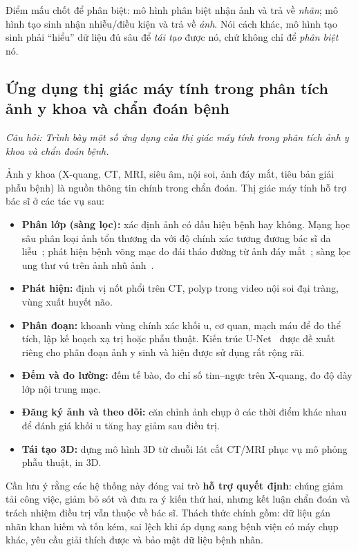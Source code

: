Điểm mấu chốt để phân biệt: mô hình phân biệt nhận ảnh và trả về \emph{nhãn}; mô hình tạo sinh nhận nhiễu/điều kiện và trả về \emph{ảnh}. Nói cách khác, mô hình tạo sinh phải ``hiểu'' dữ liệu đủ sâu để \emph{tái tạo} được nó, chứ không chỉ để \emph{phân biệt} nó.

\subsection{Ứng dụng thị giác máy tính trong phân tích ảnh y khoa và chẩn đoán bệnh}
\label{subsec:w2_medical}

\textit{Câu hỏi: Trình bày một số ứng dụng của thị giác máy tính trong phân tích ảnh y khoa và chẩn đoán bệnh.}

Ảnh y khoa (X-quang, CT, MRI, siêu âm, nội soi, ảnh đáy mắt, tiêu bản giải phẫu bệnh) là nguồn thông tin chính trong chẩn đoán. Thị giác máy tính hỗ trợ bác sĩ ở các tác vụ sau:

\begin{itemize}
    \item \textbf{Phân lớp (sàng lọc):} xác định ảnh có dấu hiệu bệnh hay không. Mạng học sâu phân loại ảnh tổn thương da với độ chính xác tương đương bác sĩ da liễu~\citep{esteva2017dermatologist}; phát hiện bệnh võng mạc do đái tháo đường từ ảnh đáy mắt~\citep{gulshan2016development}; sàng lọc ung thư vú trên ảnh nhũ ảnh~\citep{mckinney2020international}.
    \item \textbf{Phát hiện:} định vị nốt phổi trên CT, polyp trong video nội soi đại tràng, vùng xuất huyết não.
    \item \textbf{Phân đoạn:} khoanh vùng chính xác khối u, cơ quan, mạch máu để đo thể tích, lập kế hoạch xạ trị hoặc phẫu thuật. Kiến trúc U-Net~\citep{ronneberger2015unet} được đề xuất riêng cho phân đoạn ảnh y sinh và hiện được sử dụng rất rộng rãi.
    \item \textbf{Đếm và đo lường:} đếm tế bào, đo chỉ số tim--ngực trên X-quang, đo độ dày lớp nội trung mạc.
    \item \textbf{Đăng ký ảnh và theo dõi:} căn chỉnh ảnh chụp ở các thời điểm khác nhau để đánh giá khối u tăng hay giảm sau điều trị.
    \item \textbf{Tái tạo 3D:} dựng mô hình 3D từ chuỗi lát cắt CT/MRI phục vụ mô phỏng phẫu thuật, in 3D.
\end{itemize}

Cần lưu ý rằng các hệ thống này đóng vai trò \textbf{hỗ trợ quyết định}: chúng giảm tải công việc, giảm bỏ sót và đưa ra ý kiến thứ hai, nhưng kết luận chẩn đoán và trách nhiệm điều trị vẫn thuộc về bác sĩ. Thách thức chính gồm: dữ liệu gán nhãn khan hiếm và tốn kém, sai lệch khi áp dụng sang bệnh viện có máy chụp khác, yêu cầu giải thích được và bảo mật dữ liệu bệnh nhân.


